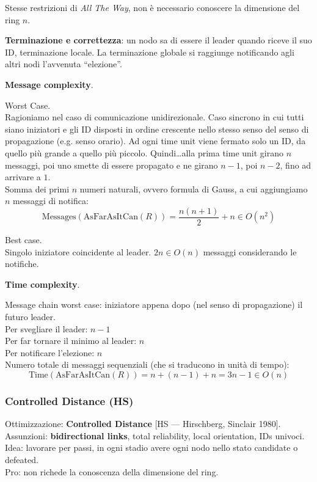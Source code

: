 
Stesse restrizioni di \textit{All The Way}, non è necessario conoscere la dimensione del ring $n$.

\textbf{Terminazione e correttezza}: un nodo sa di essere il leader quando riceve il suo ID, terminazione locale. La terminazione
globale si raggiunge notificando agli altri nodi l'avvenuta ``elezione''.

\textbf{Message complexity}.

Worst Case. \\
Ragioniamo nel caso di comunicazione unidirezionale.
Caso sincrono in cui tutti siano iniziatori e gli ID disposti in ordine crescente nello stesso senso del senso di propagazione
(e.g. senso orario).
Ad ogni time unit viene fermato solo un ID, da quello più grande a quello più piccolo.
Quindi\dots alla prima time unit girano $n$ messaggi, poi uno smette di essere propagato e ne girano $n-1$, poi $n-2$, fino ad arrivare a $1$. \\
Somma dei primi $n$ numeri naturali, ovvero formula di Gauss, a cui aggiungiamo $n$ messaggi di notifica:
$$ \text{Messages}(\text{AsFarAsItCan}(R)) = \frac{n (n+1)}{2} + n \in O(n^2) $$


Best case. \\
Singolo iniziatore coincidente al leader. $2n \in O(n)$ messaggi considerando le notifiche.

\textbf{Time complexity}.

Message chain worst case: iniziatore appena dopo (nel senso di propagazione) il futuro leader. \\
Per svegliare il leader: $n-1$ \\
Per far tornare il minimo al leader: $n$ \\
Per notificare l'elezione: $n$ \\
Numero totale di messaggi sequenziali (che si traducono in unità di tempo):
$$ \text{Time}(\text{AsFarAsItCan}(R)) = n + (n-1) + n = 3n - 1 \in O(n) $$

\subsubsection{Controlled Distance (HS)}
Ottimizzazione: \textbf{Controlled Distance} [HS --- Hirschberg, Sinclair 1980]. \\
Assunzioni: \textbf{bidirectional links}, total reliability, local orientation, IDs univoci. \\
Idea: lavorare per passi, in ogni stadio avere ogni nodo nello stato candidate o defeated. \\
Pro: non richede la conoscenza della dimensione del ring. \\

